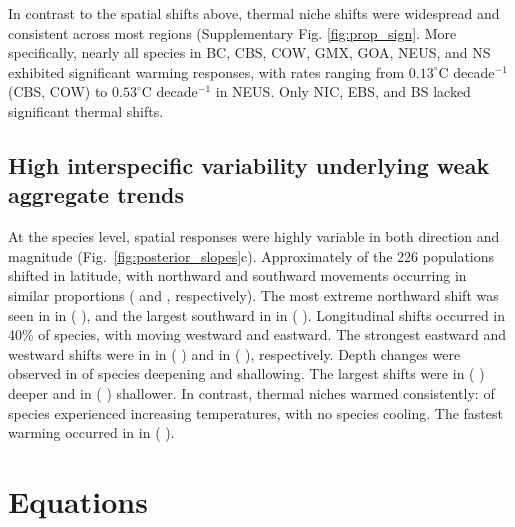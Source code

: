 \documentclass[lineno,pdflatex,sn-nature]{sn-jnl}%
\begin{document}
In contrast to the spatial shifts above, thermal niche shifts were widespread and consistent across most regions (Supplementary Fig. \ref{fig:prop_sign}. More specifically, nearly all species in BC, CBS, COW, GMX, GOA, NEUS, and NS exhibited significant warming responses, with rates ranging from $0.13^{\circ}$C decade$^{-1}$ (CBS, COW) to $0.53^{\circ}$C decade$^{-1}$ in NEUS. Only NIC, EBS, and BS lacked significant thermal shifts.

\subsection{High interspecific variability underlying weak aggregate trends}





At the species level, spatial responses were highly variable in both direction and magnitude (Fig.~\ref{fig:posterior_slopes}c). Approximately \LatPerc{} of the 226 populations shifted in latitude, with northward and southward movements occurring in similar proportions (\LatNorthingPerc{} and \LatSouthingPerc{}, respectively). The most extreme northward shift was seen in \MaxLatSpecies{} in \MaxLatRegion{} (\MaxLatMedian{} \MaxLatCI{}), and the largest southward in \MinLatSpecies{} in \MinLatRegion{} (\MinLatMedian{} \MinLatCI{}). Longitudinal shifts occurred in 40\% of species, with \LonWestingPerc{} moving westward and \LonEastingPerc{} eastward. The strongest eastward and westward shifts were in \MaxLonSpecies{} in \MaxLonRegion{} (\MaxLonMedian{} \MaxLonCI{}) and \MinLonSpecies{} in \MinLonRegion{} (\MinLonMedian{} \MinLonCI{}), respectively. Depth changes were observed in \DepthDeepeningPerc{} of species deepening and \DepthShallowingPerc{} shallowing. The largest shifts were \MaxDepthSpecies{} in \MaxDepthRegion{} (\MaxDepthMedian{} \MaxDepthCI{}) deeper and \MinDepthSpecies{} in \MinDepthRegion{} (\MinDepthMedian{} \MinDepthCI{}) shallower. In contrast, thermal niches warmed consistently: \ThermalPerc{} of species experienced increasing temperatures, with no species cooling. The fastest warming occurred in \MaxThermalSpecies{} in \MaxThermalRegion{} (\MaxThermalMedian{} \MaxThermalCI{}).



\section{Equations}\label{sec4}
\end{document}

